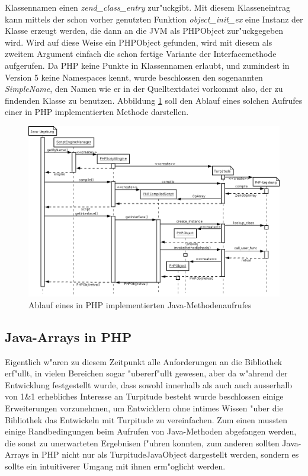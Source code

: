 Klassennamen einen \emph{zend\_class\_entry} zur"uckgibt. Mit diesem Klasseneintrag kann mittels der schon vorher genutzten Funktion \emph{object\_init\_ex}
eine Instanz der Klasse erzeugt werden, die dann an die JVM als PHPObject zur"uckgegeben wird. Wird auf diese Weise ein PHPObject gefunden, wird mit diesem
als zweitem Argument einfach die schon fertige Variante der Interfacemethode aufgerufen. Da PHP keine Punkte in Klassennamen erlaubt, und zumindest in
Version 5 keine Namespaces kennt, wurde beschlossen den sogenannten \emph{SimpleName}, den Namen wie er in der Quelltextdatei vorkommt also, der zu findenden Klasse 
zu benutzen. Abbildung \ref{fig:javaseq} soll den Ablauf eines solchen Aufrufes einer in PHP implementierten Methode darstellen. 

\begin{figure}[h]
\includegraphics[width=\textwidth]{chap1/img/javaseq.png}
\caption{Ablauf eines in PHP implementierten Java-Methodenaufrufes}
\label{fig:javaseq}
\end{figure}

\subsection{Java-Arrays in PHP}
\label{sec:chap1:impl:11}

Eigentlich w"aren zu diesem Zeitpunkt alle Anforderungen an die Bibliothek erf"ullt, in vielen Bereichen sogar "ubererf"ullt gewesen, aber da w"ahrend
der Entwicklung festgestellt wurde, dass sowohl innerhalb als auch auch ausserhalb von 1\&1 erhebliches Interesse an Turpitude besteht wurde beschlossen 
einige Erweiterungen vorzunehmen, um Entwicklern ohne intimes Wissen "uber die Bibliothek das Entwickeln mit Turpitude zu vereinfachen.
Zum einen mussten einige Randbedingungen beim Aufrufen von Java-Methoden abgefangen werden, die sonst zu unerwarteten Ergebnisen f"uhren konnten, zum
anderen sollten Java-Arrays in PHP nicht nur als TurpitudeJavaObject dargestellt werden, sondern es sollte ein intuitiverer Umgang mit ihnen erm"oglicht werden.

